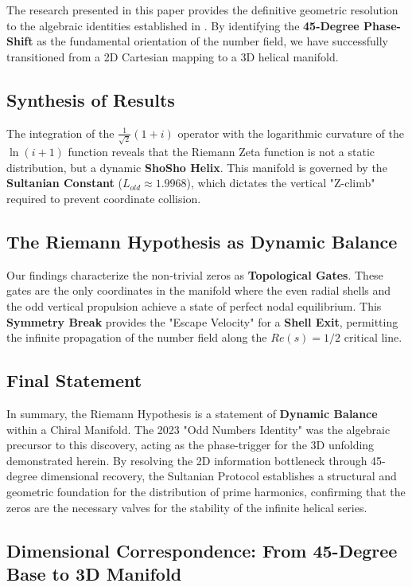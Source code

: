\documentclass[11pt,a4paper]{article}
\begin{document}
The research presented in this paper provides the definitive geometric resolution to the algebraic identities established in \cite{Soltan2023}. By identifying the \textbf{45-Degree Phase-Shift} as the fundamental orientation of the number field, we have successfully transitioned from a 2D Cartesian mapping to a 3D helical manifold.

\subsection{Synthesis of Results}
The integration of the $\frac{1}{\sqrt{2}}(1+i)$ operator with the logarithmic curvature of the $\ln(i+1)$ function reveals that the Riemann Zeta function is not a static distribution, but a dynamic \textbf{ShoSho Helix}. This manifold is governed by the \textbf{Sultanian Constant} ($L_{old} \approx 1.9968$), which dictates the vertical "Z-climb" required to prevent coordinate collision. 

\subsection{The Riemann Hypothesis as Dynamic Balance}
Our findings characterize the non-trivial zeros as \textbf{Topological Gates}. These gates are the only coordinates in the manifold where the even radial shells and the odd vertical propulsion achieve a state of perfect nodal equilibrium. This \textbf{Symmetry Break} provides the "Escape Velocity" for a \textbf{Shell Exit}, permitting the infinite propagation of the number field along the $Re(s)=1/2$ critical line.

\subsection{Final Statement}
In summary, the Riemann Hypothesis is a statement of \textbf{Dynamic Balance} within a Chiral Manifold. The 2023 "Odd Numbers Identity" was the algebraic precursor to this discovery, acting as the phase-trigger for the 3D unfolding demonstrated herein. By resolving the 2D information bottleneck through 45-degree dimensional recovery, the Sultanian Protocol establishes a structural and geometric foundation for the distribution of prime harmonics, confirming that the zeros are the necessary valves for the stability of the infinite helical series.

\subsection{Dimensional Correspondence: From 45-Degree Base to 3D Manifold}
\end{document}
